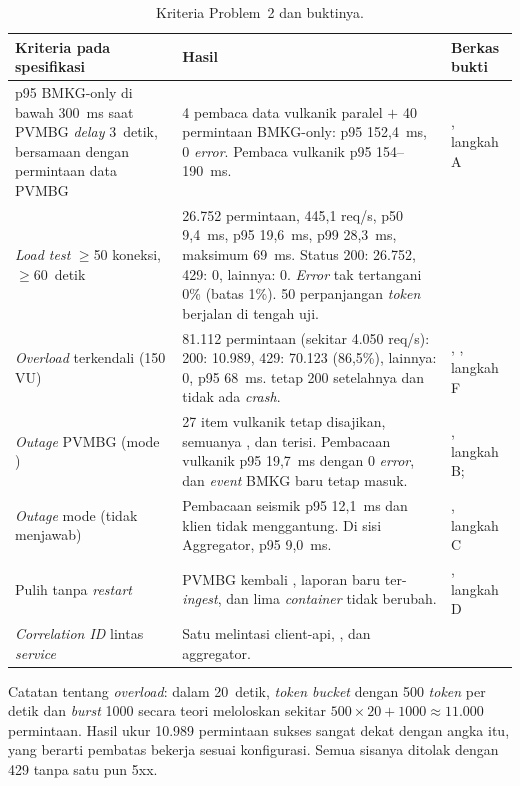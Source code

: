 \begin{table}[H]
\centering\small
\begin{tabularx}{\textwidth}{@{}L{3.6cm}YL{2.9cm}@{}}
\toprule
\textbf{Kriteria pada spesifikasi} & \textbf{Hasil} & \textbf{Berkas bukti}\\
\midrule
p95 BMKG-only di bawah 300~ms saat PVMBG \emph{delay} 3~detik, bersamaan dengan permintaan data PVMBG & 4 pembaca data vulkanik paralel $+$ 40 permintaan BMKG-only: p95 152,4~ms, 0 \emph{error}. Pembaca vulkanik p95 154--190~ms. & , langkah A\\
\emph{Load test} $\ge$50 koneksi, $\ge$60~detik & 26.752 permintaan, 445,1 req/s, p50 9,4~ms, p95 19,6~ms, p99 28,3~ms, maksimum 69~ms. Status 200: 26.752, 429: 0, lainnya: 0. \emph{Error} tak tertangani 0\% (batas 1\%). 50 perpanjangan \emph{token} berjalan di tengah uji. & \\
\emph{Overload} terkendali (150 VU) & 81.112 permintaan (sekitar 4.050 req/s): 200: 10.989, 429: 70.123 (86,5\%), lainnya: 0, p95 68~ms.  tetap 200 setelahnya dan tidak ada \emph{crash}. & , , langkah F\\
\emph{Outage} PVMBG (mode ) & 27 item vulkanik tetap disajikan, semuanya , dan  terisi. Pembacaan vulkanik p95 19,7~ms dengan 0 \emph{error}, dan \emph{event} BMKG baru tetap masuk. & , langkah B; \\
\emph{Outage} mode  (tidak menjawab) & Pembacaan seismik p95 12,1~ms dan klien tidak menggantung. Di sisi Aggregator, p95 9,0~ms. & , langkah C\\
Pulih tanpa \emph{restart} & PVMBG kembali , laporan baru ter-\emph{ingest}, dan  lima \emph{container} tidak berubah. & , langkah D\\
\emph{Correlation ID} lintas \emph{service} & Satu  melintasi  client-api, , dan  aggregator. & \\
\bottomrule
\end{tabularx}
\caption{Kriteria Problem~2 dan buktinya.}
\end{table}

Catatan tentang \emph{overload}: dalam 20~detik, \emph{token bucket} dengan 500 \emph{token} per detik dan \emph{burst} 1000 secara teori
meloloskan sekitar $500\times 20+1000 \approx 11.000$ permintaan. Hasil ukur 10.989 permintaan sukses sangat dekat dengan
angka itu, yang berarti pembatas bekerja sesuai konfigurasi. Semua sisanya ditolak dengan 429 tanpa satu pun 5xx.

